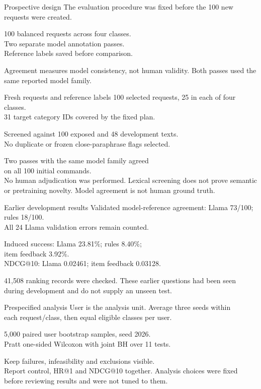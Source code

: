 \documentclass[10pt]{beamer}
\begin{document}
\begin{frame}{Prospective design}
\small
The evaluation procedure was fixed before the 100 new requests were created.

100 balanced requests across four classes.\\
Two separate model annotation passes.\\
Reference labels saved before comparison.

Agreement measures model consistency, not human validity.
\vfill
\tiny Both passes used the same reported model family.
\end{frame}

\begin{frame}{Fresh requests and reference labels}
\small
100 selected requests, 25 in each of four classes.\\
31 target category IDs covered by the fixed plan.

Screened against 100 exposed and 48 development texts.\\
No duplicate or frozen close-paraphrase flags selected.

Two passes with the same model family agreed\\
on all 100 initial commands.\\
No human adjudication was performed.
\vfill
\tiny Lexical screening does not prove semantic or pretraining novelty. Model agreement is not human ground truth.
\end{frame}


\begin{frame}{Earlier development results}
\small
Validated model-reference agreement: Llama 73/100; rules 18/100.\\
All 24 Llama validation errors remain counted.

Induced success: Llama 23.81\%; rules 8.40\%;\\
item feedback 3.92\%.\\
NDCG@10: Llama 0.02461; item feedback 0.03128.

41,508 ranking records were checked.
\vfill
\tiny These earlier questions had been seen during development and do not supply an unseen test.
\end{frame}

\begin{frame}{Prespecified analysis}
\small
User is the analysis unit. Average three seeds within\\
each request/class, then equal eligible classes per user.

5,000 paired user bootstrap samples, seed 2026.\\
Pratt one-sided Wilcoxon with joint BH over 11 tests.

Keep failures, infeasibility and exclusions visible.\\
Report control, HR@1 and NDCG@10 together.
\vfill
\tiny Analysis choices were fixed before reviewing results and were not tuned to them.
\end{frame}
\end{document}
